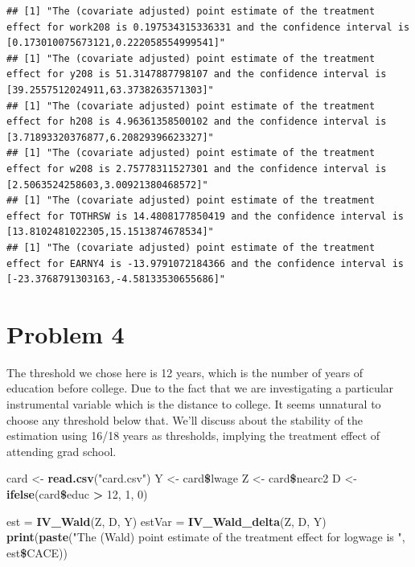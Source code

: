 \documentclass[]{article}
\newenvironment{Shaded}{\begin{snugshade}}{\end{snugshade}}
\newcommand{\KeywordTok}[1]{\textcolor[rgb]{0.13,0.29,0.53}{\textbf{#1}}}
\newcommand{\DecValTok}[1]{\textcolor[rgb]{0.00,0.00,0.81}{#1}}
\newcommand{\StringTok}[1]{\textcolor[rgb]{0.31,0.60,0.02}{#1}}
\newcommand{\OperatorTok}[1]{\textcolor[rgb]{0.81,0.36,0.00}{\textbf{#1}}}
\newcommand{\NormalTok}[1]{#1}
\begin{document}
\begin{verbatim}
## [1] "The (covariate adjusted) point estimate of the treatment effect for work208 is 0.197534315336331 and the confidence interval is [0.173010075673121,0.222058554999541]"
## [1] "The (covariate adjusted) point estimate of the treatment effect for y208 is 51.3147887798107 and the confidence interval is [39.2557512024911,63.3738263571303]"
## [1] "The (covariate adjusted) point estimate of the treatment effect for h208 is 4.96361358500102 and the confidence interval is [3.71893320376877,6.20829396623327]"
## [1] "The (covariate adjusted) point estimate of the treatment effect for w208 is 2.75778311527301 and the confidence interval is [2.5063524258603,3.00921380468572]"
## [1] "The (covariate adjusted) point estimate of the treatment effect for TOTHRSW is 14.4808177850419 and the confidence interval is [13.8102481022305,15.1513874678534]"
## [1] "The (covariate adjusted) point estimate of the treatment effect for EARNY4 is -13.9791072184366 and the confidence interval is [-23.3768791303163,-4.58133530655686]"
\end{verbatim}

\section*{Problem 4}

The threshold we chose here is 12 years, which is the number of years of
education before college. Due to the fact that we are investigating a
particular instrumental variable which is the distance to college. It
seems unnatural to choose any threshold below that. We'll discuss about
the stability of the estimation using 16/18 years as thresholds,
implying the treatment effect of attending grad school.

\begin{Shaded}
\begin{Highlighting}[]
\NormalTok{card <-}\StringTok{ }\KeywordTok{read.csv}\NormalTok{(}\StringTok{"card.csv"}\NormalTok{)}
\NormalTok{Y <-}\StringTok{ }\NormalTok{card}\OperatorTok{\$}\NormalTok{lwage}
\NormalTok{Z <-}\StringTok{ }\NormalTok{card}\OperatorTok{\$}\NormalTok{nearc2}
\NormalTok{D <-}\StringTok{ }\KeywordTok{ifelse}\NormalTok{(card}\OperatorTok{\$}\NormalTok{educ }\OperatorTok{>}\StringTok{ }\DecValTok{12}\NormalTok{, }\DecValTok{1}\NormalTok{, }\DecValTok{0}\NormalTok{)}
\end{Highlighting}
\end{Shaded}

\begin{Shaded}
\begin{Highlighting}[]
\NormalTok{est =}\StringTok{ }\KeywordTok{IV_Wald}\NormalTok{(Z, D, Y)}
\NormalTok{estVar =}\StringTok{ }\KeywordTok{IV_Wald_delta}\NormalTok{(Z, D, Y)}
\KeywordTok{print}\NormalTok{(}\KeywordTok{paste}\NormalTok{(}\StringTok{"The (Wald) point estimate of the treatment effect for logwage is "}\NormalTok{, est}\OperatorTok{\$}\NormalTok{CACE))}
\end{Highlighting}
\end{Shaded}
\end{document}
